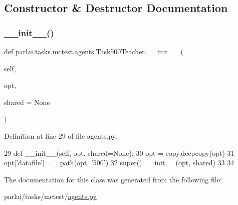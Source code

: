 \subsection{Constructor \& Destructor Documentation}
\mbox{\label{classparlai_1_1tasks_1_1mctest_1_1agents_1_1Task500Teacher_a122ab6b53f9bb97f84ae1a5e29a6deca}} 
\subsubsection{\texorpdfstring{\+\_\+\+\_\+init\+\_\+\+\_\+()}{\_\_init\_\_()}}
{\footnotesize\ttfamily def parlai.\+tasks.\+mctest.\+agents.\+Task500\+Teacher.\+\_\+\+\_\+init\+\_\+\+\_\+ (\begin{DoxyParamCaption}\item[{}]{self,  }\item[{}]{opt,  }\item[{}]{shared = {\ttfamily None} }\end{DoxyParamCaption})}



Definition at line 29 of file agents.\+py.


\begin{DoxyCode}
29     \textcolor{keyword}{def }\_\_init\_\_(self, opt, shared=None):
30         opt = copy.deepcopy(opt)
31         opt[\textcolor{stringliteral}{'datafile'}] = \_path(opt, \textcolor{stringliteral}{'500'})
32         super().\_\_init\_\_(opt, shared)
33 
34 
\end{DoxyCode}


The documentation for this class was generated from the following file\+:\begin{DoxyCompactItemize}
\item 
parlai/tasks/mctest/\hyperlink{parlai_2tasks_2mctest_2agents_8py}{agents.\+py}\end{DoxyCompactItemize}
